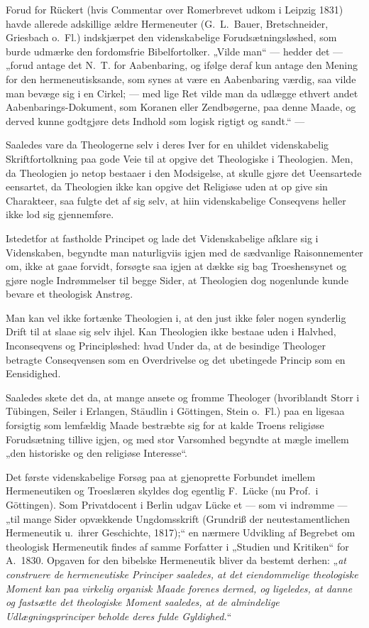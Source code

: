 \documentclass[12pt,a4paper]{book}
\newcommand{\opage}[1]{\marginnote{\footnotesize\textit{[#1]}}}
\begin{document}
Forud for Rückert (hvis Commentar over Romerbrevet udkom i Leipzig 1831)
havde allerede adskillige ældre Hermeneuter (G.\ L.\ Bauer,
Bretschneider, Griesbach o.\ Fl.) indskjærpet den videnskabelige
Forudsætningsløshed, som burde udmærke den fordomsfrie Bibelfortolker.
„Vilde man“ --- hedder det --- „forud antage det N.\ T. for Aabenbaring,
og ifølge deraf kun antage den Mening for den hermeneutisksande, som
synes at være en Aabenbaring værdig, saa vilde man bevæge sig i en
Cirkel; --- med lige Ret vilde man da udlægge ethvert andet
Aabenbarings-Dokument, som Koranen eller Zendbøgerne, paa denne Maade, og
derved kunne godtgjøre dets Indhold som logisk rigtigt og sandt.“ ---

Saaledes vare da Theologerne selv i deres Iver for en uhildet
videnskabelig Skriftfortolkning paa gode Veie til at opgive det
Theologiske i Theologien. Men, da Theologien jo netop bestaaer i den
Modsigelse, at skulle gjøre det Ueensartede eensartet, da Theologien ikke
kan opgive det Religiøse uden at op\-%
\opage{61}give sin Charakteer, saa fulgte det af sig selv, at hiin videnskabelige
Conseqvens heller ikke lod sig gjennemføre.

Istedetfor at fastholde Principet og lade det Videnskabelige afklare sig
i Videnskaben, begyndte man naturligviis igjen med de sædvanlige
Raisonnementer om, ikke at gaae forvidt, forsøgte saa igjen at dække sig
bag Troeshensynet og gjøre nogle Indrømmelser til begge Sider, at
Theologien dog nogenlunde kunde bevare et theologisk Anstrøg.

Man kan vel ikke fortænke Theologien i, at den just ikke føler nogen
synderlig Drift til at slaae sig selv ihjel. Kan Theologien ikke bestaae
uden i Halvhed, Inconseqvens og Principløshed: hvad Under da, at de
besindige Theologer betragte Conseqvensen som en Overdrivelse og det
ubetingede Princip som en Eensidighed.

Saaledes skete det da, at mange ansete og fromme Theologer (hvoriblandt
Storr i Tübingen, Seiler i Erlangen, Stäudlin i Göttingen, Stein o.\ Fl.)
paa en ligesaa forsigtig som lemfældig Maade bestræbte sig for at kalde
Troens religiøse Forudsætning tillive igjen, og med stor Varsomhed
begyndte at mægle imellem „den historiske og den religiøse Interesse“.

Det første videnskabelige Forsøg paa at gjenoprette Forbundet imellem
Hermeneutiken og Troeslæren skyldes dog egentlig F.\ Lücke (nu Prof.\ i
Göttingen). Som Privatdocent i Berlin udgav Lücke et --- som vi indrømme
--- „til mange Sider opvækkende Ungdomsskrift (Grundriß der
neutestamentlichen Hermeneutik u.\ ihrer Geschichte, 1817);“ en nærmere
Udvikling af Begrebet om theologisk Hermeneutik findes af samme Forfatter
i „Studien und Kritiken“ for A.\ 1830. Opgaven for den bibelske
Hermeneutik bliver da bestemt derhen: „\emph{at construere de
hermeneutiske Principer saaledes, at det eiendommelige theologiske Moment
kan paa virkelig organisk Maade forenes dermed, og ligeledes, at danne og
fastsætte
\opage{62} det theologiske Moment saaledes, at de almindelige Udlægningsprinciper
beholde deres fulde Gyldighed.}“
\end{document}
